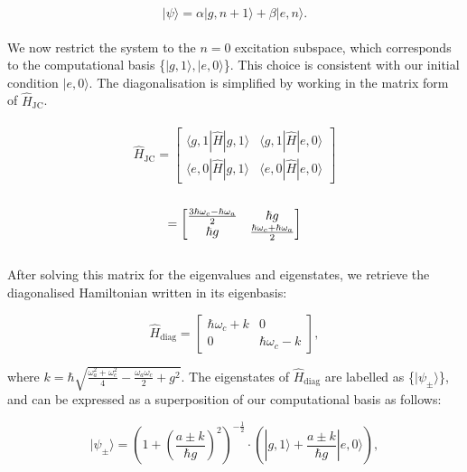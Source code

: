 \documentclass[11pt]{article}
\begin{document}
\begin{equation*}
    |\psi\rangle = \alpha|g,n+1\rangle + \beta|e,n\rangle.
\end{equation*}
\\
We now restrict the system to the $n=0$ excitation subspace, which corresponds to the computational basis \small{\{$|g,1\rangle,|e,0\rangle$\}}. This choice is consistent with our initial condition $|e,0\rangle$. The diagonalisation is simplified by working in the matrix form of $\hat{H}_{\scriptscriptstyle \text{JC}}$.\\
\\
\begin{equation*}
    \hat{H}_{\scriptscriptstyle \text{JC}} = 
    \begin{bmatrix}
        \langle g,1|\hat{H}|g,1\rangle & \langle g,1|\hat{H}|e,0\rangle\\
        \langle e,0|\hat{H}|g,1\rangle & \langle e,0|\hat{H}|e,0\rangle
    \end{bmatrix}
\end{equation*}
\\
\begin{equation*}
=
    \begin{bmatrix}
        \large{\frac{3\hbar\omega_c - \hbar\omega_a}{2}} & \small{\hbar g} \\
        \small{\hbar g} & \large{\frac{\hbar\omega_c + \hbar\omega_a}{2}}
    \end{bmatrix}
\end{equation*}
\\
After solving this matrix for the eigenvalues and eigenstates, we retrieve the diagonalised Hamiltonian written in its eigenbasis:

\begin{equation*}
    \hat{H}_{\scriptscriptstyle \text{diag}} = 
    \begin{bmatrix}
        \hbar\omega_c + k & 0 \\
        0 & \hbar\omega_c - k
    \end{bmatrix},
\end{equation*}

where $k = \hbar\sqrt{\frac{\omega_a^2 + \omega_c^2}{4} - \frac{\omega_a\omega_c}{2} + g^2}$. The eigenstates of $\hat{H}_{\scriptscriptstyle \text{diag}}$ are labelled as \{$|\psi_\pm\rangle$\}, and can be expressed as a superposition of our computational basis as follows:

\begin{equation*}
    |\psi_\pm\rangle = \left(1 + \left(\frac{a\pm k}{\hbar g}\right)^2\right)^{-\frac{1}{2}} \cdot\left(|g,1\rangle + \frac{a\pm k}{\hbar g}|e,0\rangle\right),
\end{equation*}
\end{document}
